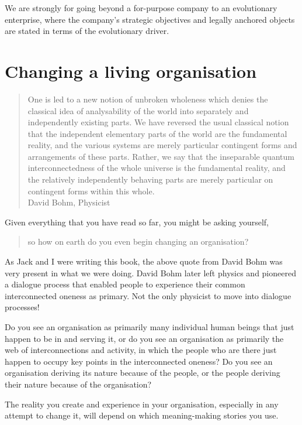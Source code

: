 We are strongly for going beyond a for-purpose company to an evolutionary enterprise, where the company’s strategic objectives and legally anchored objects are stated in terms of the evolutionary driver. 




\section{Changing a living organisation}
\label{section:change-living-organisation}
\begin{quotation}
One is led to a new notion of unbroken wholeness which denies the classical idea of analysability of the world into separately and independently existing parts. We have reversed the usual classical notion that the independent elementary parts of the world are the fundamental reality, and the various systems are merely particular contingent forms and arrangements of these parts. Rather, we say that the inseparable quantum interconnectedness of the whole universe is the fundamental reality, and the relatively independently behaving parts are merely particular on contingent forms within this whole.\\
\raggedleft\textemdash David Bohm, Physicist
\end{quotation}  


Given everything that you have read so far, you might be asking yourself, 


\begin{quote} 
so how on earth do you even begin changing an organisation?
\end{quote}


As Jack and I were writing this book, the above quote from David Bohm was very present in what we were doing. David Bohm later left physics and pioneered a dialogue process that enabled people to experience their common interconnected oneness as primary. Not the only physicist to move into dialogue processes! 


Do you see an organisation as primarily many individual human beings that just happen to be in and serving it, or do you see an organisation as primarily the web of interconnections and activity, in which the people who are there just happen to occupy key points in the interconnected oneness? Do you see an organisation deriving its nature because of the people, or the people deriving their nature because of the organisation? 


The reality you create and experience in your organisation, especially in any attempt to change it, will depend on which meaning\hyp{}making stories you use. 


